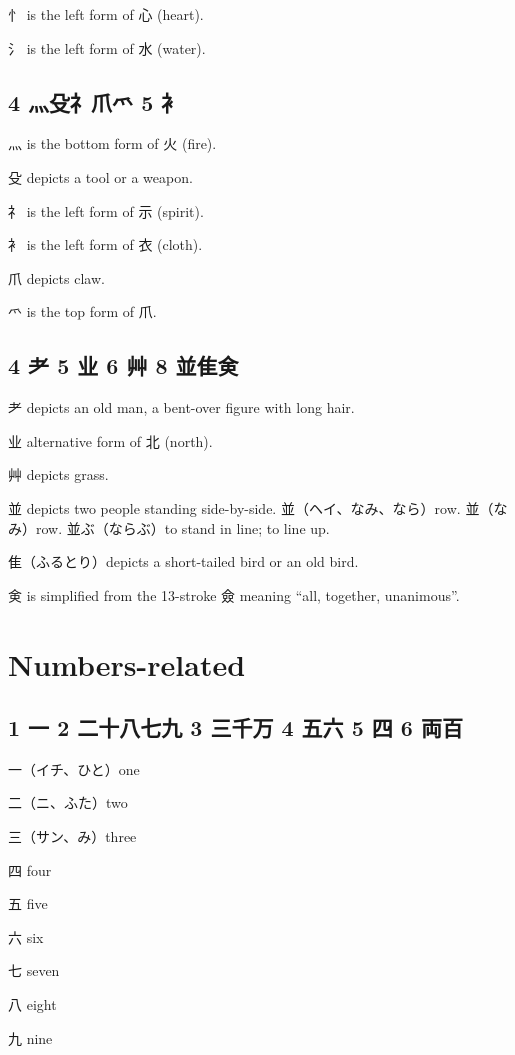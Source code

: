 忄 is the left form of 心 (heart).

氵 is the left form of 水 (water).

\subsection{4 灬殳礻爪爫 5 衤}

灬 is the bottom form of 火 (fire).

殳 depicts a tool or a weapon.

礻 is the left form of 示 (spirit).

衤 is the left form of 衣 (cloth).

爪 depicts claw.

爫 is the top form of 爪.

\subsection{4 耂 5 业 6 艸 8 並隹㑒}

耂 depicts an old man, a bent-over figure with long hair.

业 alternative form of 北 (north).

艸 depicts grass.

並 depicts two people standing side-by-side.
並（ヘイ、なみ、なら）row.
並（なみ）row.
並ぶ（ならぶ）to stand in line; to line up.

隹（ふるとり）depicts a short-tailed bird or an old bird.

㑒 is simplified from the 13-stroke 僉
meaning ``all, together, unanimous''.

\section{Numbers-related}

\subsection{1 一 2 二十八七九 3 三千万 4 五六 5 四 6 両百}

一（イチ、ひと）one

二（ニ、ふた）two

三（サン、み）three

四 four

五 five

六 six

七 seven

八 eight

九 nine

